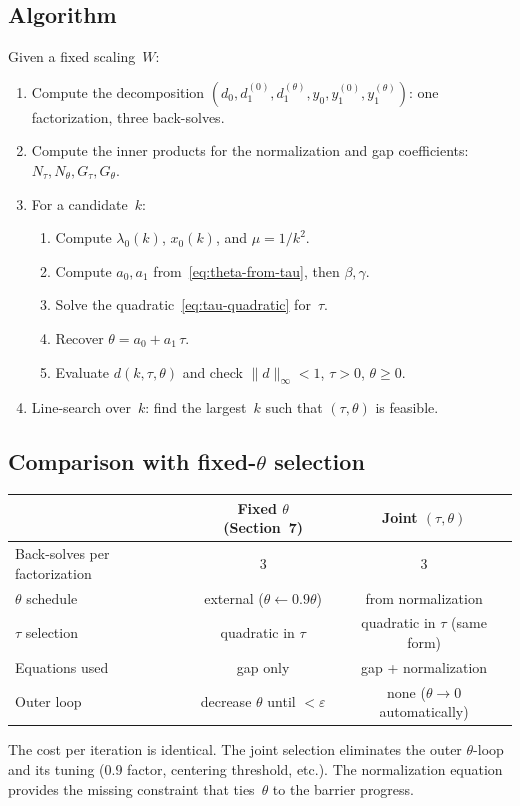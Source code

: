 \documentclass{article}
\begin{document}
\subsection{Algorithm}

Given a fixed scaling~$W$:
\begin{enumerate}
  \item Compute the decomposition $(d_0, d_1^{(0)}, d_1^{(\theta)},
        y_0, y_1^{(0)}, y_1^{(\theta)})$: one factorization, three back-solves.
  \item Compute the inner products for the normalization and gap
        coefficients: $N_\tau, N_\theta, G_\tau, G_\theta$.
  \item For a candidate~$k$:
    \begin{enumerate}
      \item Compute $\lambda_0(k)$, $x_0(k)$, and $\mu = 1/k^2$.
      \item Compute $a_0, a_1$ from~\eqref{eq:theta-from-tau},
            then $\beta, \gamma$.
      \item Solve the quadratic~\eqref{eq:tau-quadratic} for~$\tau$.
      \item Recover $\theta = a_0 + a_1\,\tau$.
      \item Evaluate $d(k, \tau, \theta)$ and check $\|d\|_\infty < 1$,
            $\tau > 0$, $\theta \geq 0$.
    \end{enumerate}
  \item Line-search over~$k$: find the largest~$k$ such that
        $(\tau, \theta)$ is feasible.
\end{enumerate}

\subsection{Comparison with fixed-$\theta$ selection}

\begin{center}
\begin{tabular}{lcc}
  & Fixed $\theta$ (Section~7) & Joint $(\tau,\theta)$ \\
  \hline
  Back-solves per factorization & 3 & 3 \\
  $\theta$ schedule & external ($\theta \leftarrow 0.9\theta$) & from normalization \\
  $\tau$ selection & quadratic in $\tau$ & quadratic in $\tau$ (same form) \\
  Equations used & gap only & gap + normalization \\
  Outer loop & decrease $\theta$ until $< \varepsilon$ & none ($\theta \to 0$ automatically) \\
\end{tabular}
\end{center}

The cost per iteration is identical.  The joint selection eliminates
the outer $\theta$-loop and its tuning ($0.9$ factor, centering
threshold, etc.).  The normalization equation provides the missing
constraint that ties~$\theta$ to the barrier progress.
\end{document}
